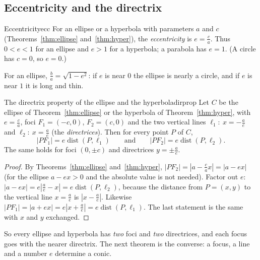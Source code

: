 \documentclass[11pt]{article}
\begin{document}
\subsection*{Eccentricity and the directrix}

\begin{defn}{Eccentricity}{ecc}
For an ellipse or a hyperbola with parameters $a$ and $c$ (Theorems~\ref{thm:ellipse} and~\ref{thm:hyper}), the \emph{eccentricity} is $e=\frac ca$. Thus $0<e<1$ for an ellipse and $e>1$ for a hyperbola; a parabola has $e=1$. (A circle has $c=0$, so $e=0$.)
\end{defn}

For an ellipse, $\frac ba=\sqrt{1-e^2}$: if $e$ is near $0$ the ellipse is nearly a circle, and if $e$ is near $1$ it is long and thin.

\begin{thm}{The directrix property of the ellipse and the hyperbola}{dirprop}
Let $C$ be the ellipse of Theorem~\ref{thm:ellipse} or the hyperbola of Theorem~\ref{thm:hyper}, with $e=\frac ca$, foci $F_1=(-c,0)$, $F_2=(c,0)$ and the two vertical lines $\ell_1:\ x=-\frac ae$ and $\ell_2:\ x=\frac ae$ (the \emph{directrices}). Then for every point $P$ of $C$,
\[
\lvert PF_1\rvert=e\operatorname{dist}(P,\ell_1)\qquad\text{and}\qquad\lvert PF_2\rvert=e\operatorname{dist}(P,\ell_2).
\]
The same holds for foci $(0,\pm c)$ and directrices $y=\pm\frac ae$.
\end{thm}
\begin{proof}
By Theorems~\ref{thm:ellipse} and~\ref{thm:hyper}, $\lvert PF_2\rvert=\left\lvert a-\frac cax\right\rvert=\lvert a-ex\rvert$ (for the ellipse $a-ex>0$ and the absolute value is not needed). Factor out $e$: $\lvert a-ex\rvert=e\left\lvert\frac ae-x\right\rvert=e\operatorname{dist}(P,\ell_2)$, because the distance from $P=(x,y)$ to the vertical line $x=\frac ae$ is $\left\lvert x-\frac ae\right\rvert$. Likewise $\lvert PF_1\rvert=\lvert a+ex\rvert=e\left\lvert x+\frac ae\right\rvert=e\operatorname{dist}(P,\ell_1)$. The last statement is the same with $x$ and $y$ exchanged.
\end{proof}

So every ellipse and hyperbola has \emph{two} foci and \emph{two} directrices, and each focus goes with the nearer directrix. The next theorem is the converse: a focus, a line and a number $e$ determine a conic.
\end{document}
